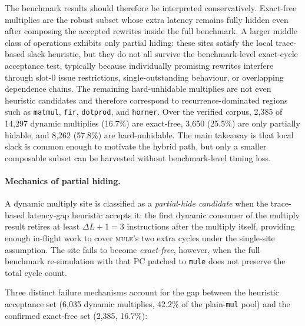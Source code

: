 The benchmark results should therefore be interpreted conservatively.
Exact-free multiplies are the robust subset whose extra latency remains
fully hidden even after composing the accepted rewrites inside the full
benchmark. A larger middle class of operations exhibits only partial
hiding: these sites satisfy the local trace-based slack heuristic, but
they do not all survive the benchmark-level exact-cycle acceptance test,
typically because individually promising rewrites interfere through
slot-0 issue restrictions, single-outstanding behaviour, or overlapping
dependence chains. The remaining hard-unhidable multiplies are not even
heuristic candidates and therefore correspond to recurrence-dominated
regions such as \texttt{matmul}, \texttt{fir}, \texttt{dotprod}, and
\texttt{horner}. Over the verified corpus, 2,385 of 14,297 dynamic
multiplies (16.7\%) are exact-free, 3,650 (25.5\%) are only partially
hidable, and 8,262 (57.8\%) are hard-unhidable. The main takeaway is
that local slack is common enough to motivate the hybrid path, but only
a smaller composable subset can be harvested without benchmark-level
timing loss.

\paragraph{Mechanics of partial hiding.}
A dynamic multiply site is classified as a \emph{partial-hide candidate}
when the trace-based latency-gap heuristic accepts it: the first
dynamic consumer of the multiply result retires at least
$\Delta L + 1 = 3$ instructions after the multiply itself, providing
enough in-flight work to cover \textsc{mule}'s two extra cycles under
the single-site assumption.  The site fails to become \emph{exact-free},
however, when the full benchmark re-simulation with that PC patched to
\texttt{mule} does not preserve the total cycle count.

Three distinct failure mechanisms account for the gap between the
heuristic acceptance set (6,035 dynamic multiplies, 42.2\% of the
plain-\texttt{mul} pool) and the confirmed exact-free set (2,385,
16.7\%):

